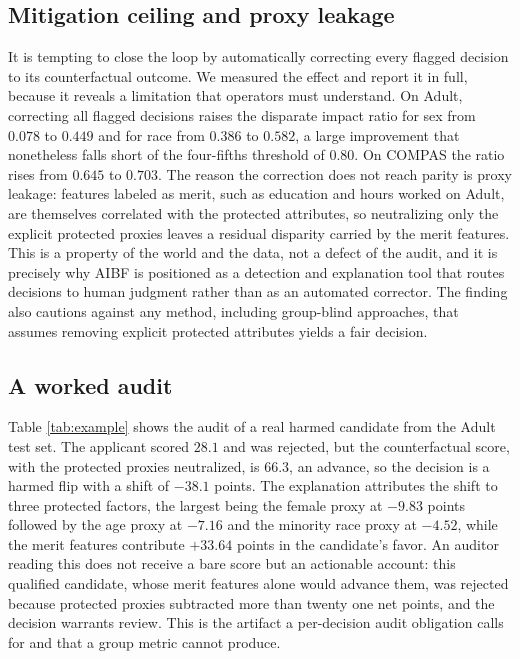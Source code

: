 \documentclass[conference]{IEEEtran}
\begin{document}
\subsection{Mitigation ceiling and proxy leakage}
It is tempting to close the loop by automatically correcting every flagged decision to
its counterfactual outcome. We measured the effect and report it in full, because it
reveals a limitation that operators must understand. On Adult, correcting all flagged
decisions raises the disparate impact ratio for sex from $0.078$ to $0.449$ and for
race from $0.386$ to $0.582$, a large improvement that nonetheless falls short of the
four-fifths threshold of $0.80$. On COMPAS the ratio rises from $0.645$ to $0.703$.
The reason the correction does not reach parity is proxy leakage: features labeled as
merit, such as education and hours worked on Adult, are themselves correlated with the
protected attributes, so neutralizing only the explicit protected proxies leaves a
residual disparity carried by the merit features. This is a property of the world and
the data, not a defect of the audit, and it is precisely why AIBF is positioned as a
detection and explanation tool that routes decisions to human judgment rather than as
an automated corrector. The finding also cautions against any method, including
group-blind approaches, that assumes removing explicit protected attributes yields a
fair decision.

\subsection{A worked audit}
Table \ref{tab:example} shows the audit of a real harmed candidate from the Adult test
set. The applicant scored $28.1$ and was rejected, but the counterfactual score, with
the protected proxies neutralized, is $66.3$, an advance, so the decision is a
harmed flip with a shift of $-38.1$ points. The explanation attributes the shift to
three protected factors, the largest being the female proxy at $-9.83$ points followed
by the age proxy at $-7.16$ and the minority race proxy at $-4.52$, while the merit
features contribute $+33.64$ points in the candidate's favor. An auditor reading this
does not receive a bare score but an actionable account: this qualified candidate,
whose merit features alone would advance them, was rejected because protected proxies
subtracted more than twenty one net points, and the decision warrants review. This is
the artifact a per-decision audit obligation calls for and that a group metric cannot
produce.
\end{document}
